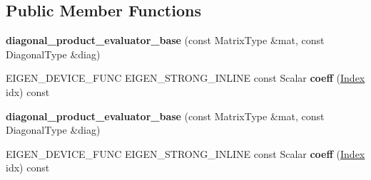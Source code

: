 \subsection*{Public Member Functions}
\begin{DoxyCompactItemize}
\item 
\mbox{\label{struct_eigen_1_1internal_1_1diagonal__product__evaluator__base_a31b91435801db27c9ca20198f0d0facf}} 
{\bfseries diagonal\+\_\+product\+\_\+evaluator\+\_\+base} (const Matrix\+Type \&mat, const Diagonal\+Type \&diag)
\item 
\mbox{\label{struct_eigen_1_1internal_1_1diagonal__product__evaluator__base_a0b502bff8d9694d1ba557b2def781917}} 
E\+I\+G\+E\+N\+\_\+\+D\+E\+V\+I\+C\+E\+\_\+\+F\+U\+NC E\+I\+G\+E\+N\+\_\+\+S\+T\+R\+O\+N\+G\+\_\+\+I\+N\+L\+I\+NE const Scalar {\bfseries coeff} (\hyperlink{namespace_eigen_a62e77e0933482dafde8fe197d9a2cfde}{Index} idx) const
\item 
\mbox{\label{struct_eigen_1_1internal_1_1diagonal__product__evaluator__base_a31b91435801db27c9ca20198f0d0facf}} 
{\bfseries diagonal\+\_\+product\+\_\+evaluator\+\_\+base} (const Matrix\+Type \&mat, const Diagonal\+Type \&diag)
\item 
\mbox{\label{struct_eigen_1_1internal_1_1diagonal__product__evaluator__base_a0b502bff8d9694d1ba557b2def781917}} 
E\+I\+G\+E\+N\+\_\+\+D\+E\+V\+I\+C\+E\+\_\+\+F\+U\+NC E\+I\+G\+E\+N\+\_\+\+S\+T\+R\+O\+N\+G\+\_\+\+I\+N\+L\+I\+NE const Scalar {\bfseries coeff} (\hyperlink{namespace_eigen_a62e77e0933482dafde8fe197d9a2cfde}{Index} idx) const
\end{DoxyCompactItemize}
